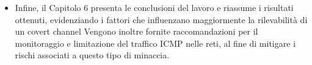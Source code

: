 \begin{itemize}
    (o la mancanza) di ritardi tra una trasmissione e la successiva. 
    \item Infine, il Capitolo 6 presenta le conclusioni del lavoro e riassume i risultati ottenuti, evidenziando i fattori che influenzano maggiormente la rilevabilità di 
    un covert channel 
    Vengono inoltre fornite raccomandazioni per il monitoraggio e limitazione del traffico ICMP nelle reti, al fine di mitigare i rischi associati a questo tipo di minaccia. 
\end{itemize}  

